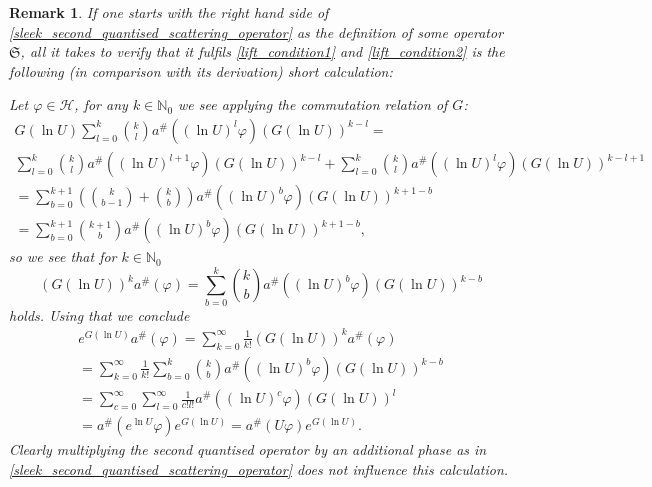 \documentclass[b5paper,draft,openbib,12pt]{memoir}
\newtheorem{Remark}[Def]{Remark}
\begin{document}
\begin{Remark}
If one starts with the right hand side of \eqref{sleek_second_quantised_scattering_operator} as the definition of 
some operator \(\mathfrak{S}\), all it takes to verify that it fulfils \eqref{lift_condition1} and \eqref{lift_condition2} is the following 
(in comparison with its derivation) short calculation:

Let \(\varphi\in \mathcal{H}\), for any \(k\in \mathbb{N}_0\) we see applying the commutation relation of \(G\):
\begin{multline*}
G(\ln U) \sum_{l=0}^k \binom{k}{l} a^\# \left(\left(\ln U\right)^l \varphi \right) \left(G(\ln U)\right)^{k-l} = \\
\sum_{l=0}^k \binom{k}{l} a^\# \left(\left(\ln U\right)^{l+1} \varphi \right) \left(G(\ln U)\right)^{k-l}
+\sum_{l=0}^k \binom{k}{l} a^\# \left(\left(\ln U\right)^l \varphi \right) \left(G(\ln U)\right)^{k-l+1}\\
= \sum_{b=0}^{k+1} \left( \binom{k}{b-1} + \binom{k}{b}\right) a^\#\left( (\ln U)^b \varphi\right) \left( G(\ln U)\right)^{k+1-b}\\
=\sum_{b=0}^{k+1}  \binom{k+1}{b}  a^\#\left( (\ln U)^b \varphi\right) \left( G(\ln U)\right)^{k+1-b},
\end{multline*}
so we see that for \(k\in\mathbb{N}_0\)
\begin{equation}
\left(G(\ln U)\right)^k a^\# (\varphi) = \sum_{b=0}^{k}  \binom{k}{b}  a^\#\left( (\ln U)^b \varphi\right) \left( G(\ln U)\right)^{k-b}
\end{equation}
holds. Using that we conclude
\begin{multline*}
e^{G(\ln U)}a^\#(\varphi) = \sum_{k=0}^\infty \frac{1}{k!} \left(G(\ln U)\right)^k a^\# (\varphi)\\
=\sum_{k=0}^\infty \frac{1}{k!}  \sum_{b=0}^{k}  \binom{k}{b}  a^\#\left( (\ln U)^b \varphi \right) \left( G(\ln U)\right)^{k-b}\\
=\sum_{c=0}^\infty \sum_{l=0}^\infty \frac{1}{c! l!} a^\#\left( (\ln U)^c \varphi \right) \left( G(\ln U)\right)^{l}\\
=a^\#\left( e^{\ln U} \varphi \right) e^{G( \ln U)}=a^\#\left( U \varphi \right) e^{G( \ln U)}.
\end{multline*}
Clearly multiplying the second quantised operator by an additional phase as in 
\eqref{sleek_second_quantised_scattering_operator} does not influence this calculation.
\end{Remark}
\end{document}
